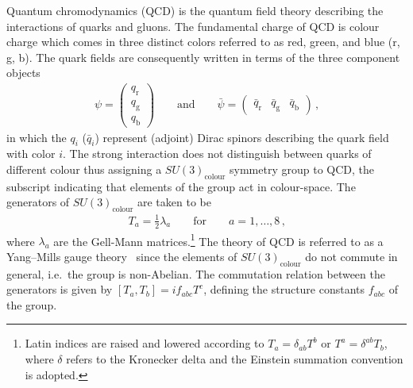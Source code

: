 Quantum chromodynamics (QCD) is the quantum field theory describing the
interactions of quarks and gluons. The fundamental charge of QCD is colour
charge which comes in three distinct colors referred to as red, green, and blue
(r, g, b). The quark fields are consequently written in terms of the three
component objects
\begin{align*}
  \psi =
  \begin{pmatrix}
    q_\text{r} \\
    q_\text{g} \\
    q_\text{b}
  \end{pmatrix}
  \qquad
  \text{and}
  \qquad
  \bar{\psi} =
  \begin{pmatrix}
    \bar{q}_\text{r} & \bar{q}_\text{g} & \bar{q}_\text{b}
  \end{pmatrix} \,\text{,}
\end{align*}
in which the $q_i$ ($\bar{q}_i$) represent (adjoint) Dirac spinors describing
the quark field with color $i$. The strong interaction does not distinguish
between quarks of different colour thus assigning a $SU(3)_{\text{colour}}$
symmetry group to QCD, the subscript indicating that elements of the group act
in colour-space. The generators of $SU(3)_{\text{colour}}$ are taken to be
\begin{align*}
  T_a = \frac{1}{2} \lambda_a \qquad \text{for} \qquad a = 1, \dots, 8 \,\text{,}
\end{align*}
where $\lambda_a$ are the Gell-Mann matrices.\footnote{Latin indices are raised
  and lowered according to $T_a = \delta_{ab} T^b$ or $T^a = \delta^{ab} T_b$,
  where $\delta$ refers to the Kronecker delta and the Einstein summation
  convention is adopted.} The theory of QCD is referred to as a Yang--Mills
gauge theory~\cite{Yang:1954ek} since the elements of $SU(3)_{\text{colour}}$ do
not commute in general, i.e.\ the group is non-Abelian. The commutation relation
between the generators is given by $[T_a, T_b] = i f_{abc} T^c$, defining the
structure constants $f_{abc}$ of the group.

